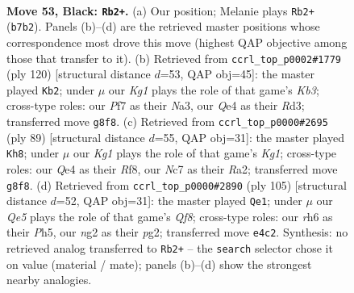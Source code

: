 \documentclass[11pt]{article}
\begin{document}
\clearpage

\begin{figure}[p]\centering
\begin{subfigure}{0.46\textwidth}\centering
\resizebox{\linewidth}{!}{%
\newchessgame
\chessboard[
  setfen={6k1/1rn2pb1/7R/3P2R1/4q3/8/5KN1/8 b - - 3 53},
  showmover=false,
  pgfstyle=straightmove, color=movearrow, markmove={b7-b2}
]}
\caption{}
\end{subfigure}\hfill
\begin{subfigure}{0.46\textwidth}\centering
\resizebox{\linewidth}{!}{%
\newchessgame
\chessboard[
  setfen={8/7k/8/1p6/1P6/NK1RB1r1/8/2r5 w - - 23 61},
  showmover=false,
  pgfstyle=straightmove, color=movearrow, markmove={b3-b2}
]}
\caption{}
\end{subfigure}
\\[4pt]
\begin{subfigure}{0.46\textwidth}\centering
\resizebox{\linewidth}{!}{%
\newchessgame
\chessboard[
  setfen={5rk1/6bp/4R3/6RP/8/8/r3NP2/5K2 b - - 2 45},
  showmover=false,
  pgfstyle=straightmove, color=movearrow, markmove={g8-h8}
]}
\caption{}
\end{subfigure}\hfill
\begin{subfigure}{0.46\textwidth}\centering
\resizebox{\linewidth}{!}{%
\newchessgame
\chessboard[
  setfen={8/8/6pk/7p/8/8/2R2PPK/R1n2q2 b - - 1 53},
  showmover=false,
  pgfstyle=straightmove, color=movearrow, markmove={f1-e1}
]}
\caption{}
\end{subfigure}
\caption{\textbf{Move 53, Black: \texttt{Rb2+}.} (a) Our position; Melanie plays \texttt{Rb2+} (\texttt{b7b2}). Panels (b)--(d) are the retrieved master positions whose correspondence most drove this move (highest QAP objective among those that transfer to it). (b) Retrieved from \texttt{ccrl\_top\_p0002\#1779} (ply 120) [structural distance $d$=53, QAP obj=45]: the master played \texttt{Kb2}; under $\mu$ our \emph{Kg1} plays the role of that game's \emph{Kb3}; cross-type roles: our \emph{P}f7 as their \emph{N}a3, our \emph{Q}e4 as their \emph{R}d3; transferred move \texttt{g8f8}. (c) Retrieved from \texttt{ccrl\_top\_p0000\#2695} (ply 89) [structural distance $d$=55, QAP obj=31]: the master played \texttt{Kh8}; under $\mu$ our \emph{Kg1} plays the role of that game's \emph{Kg1}; cross-type roles: our \emph{Q}e4 as their \emph{R}f8, our \emph{N}c7 as their \emph{R}a2; transferred move \texttt{g8f8}. (d) Retrieved from \texttt{ccrl\_top\_p0000\#2890} (ply 105) [structural distance $d$=52, QAP obj=31]: the master played \texttt{Qe1}; under $\mu$ our \emph{Qe5} plays the role of that game's \emph{Qf8}; cross-type roles: our \emph{r}h6 as their \emph{P}h5, our \emph{n}g2 as their \emph{p}g2; transferred move \texttt{e4c2}. Synthesis: no retrieved analog transferred to \texttt{Rb2+} -- the \texttt{search} selector chose it on value (material / mate); panels (b)--(d) show the strongest nearby analogies.}
\label{fig:thought-m105}
\end{figure}
\end{document}
